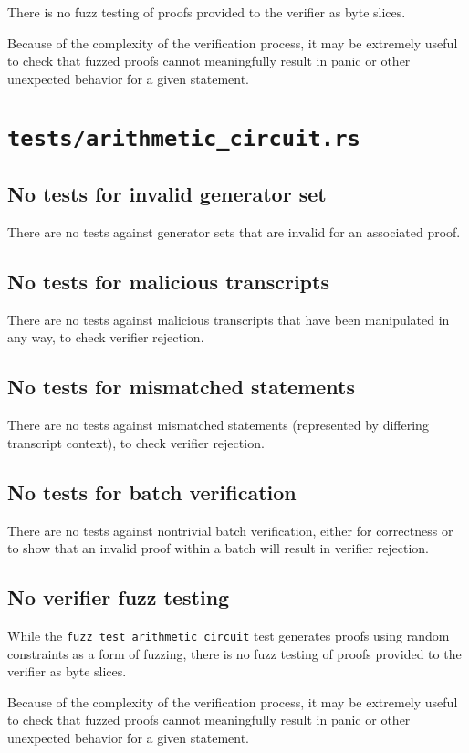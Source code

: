 \documentclass{article}
\begin{document}
There is no fuzz testing of proofs provided to the verifier as byte slices.

Because of the complexity of the verification process, it may be extremely useful to check that fuzzed proofs cannot meaningfully result in panic or other unexpected behavior for a given statement.


\section{\texttt{tests/arithmetic\_circuit.rs}}

\subsection{No tests for invalid generator set}

There are no tests against generator sets that are invalid for an associated proof.


\subsection{No tests for malicious transcripts}

There are no tests against malicious transcripts that have been manipulated in any way, to check verifier rejection.


\subsection{No tests for mismatched statements}

There are no tests against mismatched statements (represented by differing transcript context), to check verifier rejection.


\subsection{No tests for batch verification}

There are no tests against nontrivial batch verification, either for correctness or to show that an invalid proof within a batch will result in verifier rejection.


\subsection{No verifier fuzz testing}

While the \texttt{fuzz\_test\_arithmetic\_circuit} test generates proofs using random constraints as a form of fuzzing, there is no fuzz testing of proofs provided to the verifier as byte slices.

Because of the complexity of the verification process, it may be extremely useful to check that fuzzed proofs cannot meaningfully result in panic or other unexpected behavior for a given statement.




\end{document}
